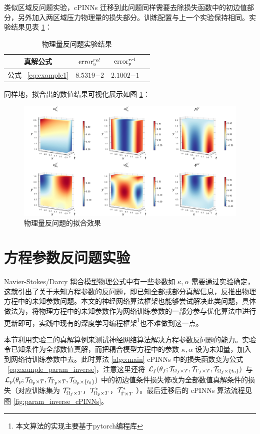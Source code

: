 类似区域反问题实验，cPINNs 迁移到此问题同样需要去除损失函数中的初边值部分，另外加入两区域压力物理量的损失部分。训练配置与上一个实验保持相同。实验结果见表 \ref{tab:example_phy_inverse}：

\begin{table}[H]
    \centering
    \caption{物理量反问题实验结果}
    \begin{tabular}{cccc}
        \toprule
        真解公式 & $\mathrm{error}^{rel}_{u}$ & $\mathrm{error}^{rel}_{p}$ \\
        \midrule
        公式 ~\eqref{eq:example1}  & $\num{8.5319}{-2}$ & $\num{2.1002}{-1}$ \\
        \bottomrule
    \end{tabular}
    \label{tab:example_phy_inverse}
\end{table}

同样地，拟合出的数值结果可视化展示如图 \ref{fig:example_phy_inverse_fitted}：

\begin{figure}[H]
    \centering
    \includegraphics[width=0.75\linewidth]{images/example_phy_inverse_fitted.png}
    \caption{ 物理量反问题的拟合效果 }
    \label{fig:example_phy_inverse_fitted}
\end{figure}

\section{方程参数反问题实验}

Navier-Stokes/Darcy 耦合模型物理公式中有一些参数如 $ \kappa, \alpha $ 需要通过实验确定，这就引出了关于未知方程参数的反问题，即已知全部或部分真解信息，反推出物理方程中的未知参数问题。本文的神经网络算法框架也能够尝试解决此类问题，具体做法为，将物理方程中的未知参数作为网络训练参数的一部分参与优化算法中进行更新即可，实践中现有的深度学习编程框架\footnote{本文算法的实现主要基于pytorch编程库}也不难做到这一点。

本节利用实验二的真解算例来测试神经网络算法解决方程参数反问题的能力。实验令已知条件为全部数值真解，而把耦合模型方程中的参数 $ \kappa, \alpha $ 设为未知量，加入到网络待训练参数中去。此时算法 \ref{algo:main} cPINNs 中的损失函数变为公式 ~\eqref{eq:example_param_inverse}，注意这里还将 $\mathcal{L}_{f}({\theta_f};{\mathcal{T}_{{\Omega_f} \times T},\mathcal{T}_{{\Gamma_f} \times T},\mathcal{T}_{{\Omega_f} \times \{t_0\}}})$ 与 $\mathcal{L}_{p}({\theta_p};{\mathcal{T}_{{\Omega_p} \times T},\mathcal{T}_{{\Gamma_p} \times T},\mathcal{T}_{{\Omega_p} \times \{t_0\}}})$ 中的初边值条件损失修改为全部数值真解条件的损失（对应训练集为 $\mathcal{T}_{{\Omega_f} \times T}^*$，$\mathcal{T}_{{\Omega_p} \times T}^*$，$\mathcal{T}_{{\tilde{\Gamma}} \times T}^*$ ）。最后迁移后的 cPINNs 算法流程见图 \ref{fig:param_inverse_cPINNs}。

